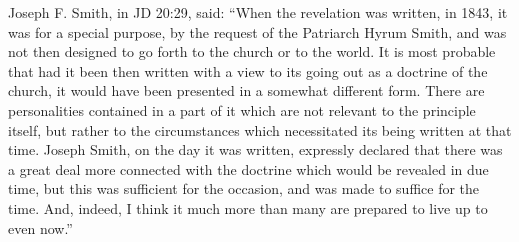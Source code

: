 		Joseph F. Smith, in JD 20:29, said: ``When the revelation was written, in 1843, it was for a special purpose, by the request of the Patriarch Hyrum Smith, and was not then designed to go forth to the church or to the world. It is most probable that had it been then written with a view to its going out as a doctrine of the church, it would have been presented in a somewhat different form. There are personalities contained in a part of it which are not relevant to the principle itself, but rather to the circumstances which necessitated its being written at that time. Joseph Smith, on the day it was written, expressly declared that there was a great deal more connected with the doctrine which would be revealed in due time, but this was sufficient for the occasion, and was made to suffice for the time. And, indeed, I think it much more than many are prepared to live up to even now.''
		
